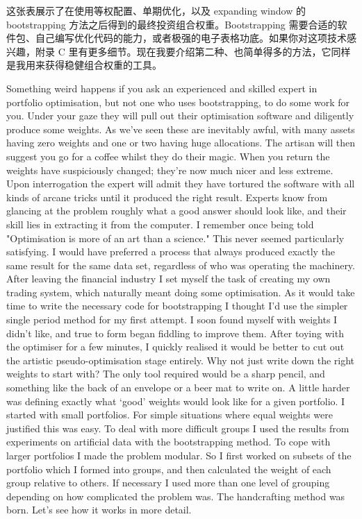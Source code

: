 \begin{chineseblock}这张表展示了在使用等权配置、单期优化，以及 expanding window 的 bootstrapping 方法之后得到的最终投资组合权重。Bootstrapping 需要合适的软件包、自己编写优化代码的能力，或者极强的电子表格功底。如果你对这项技术感兴趣，附录 C 里有更多细节。现在我要介绍第二种、也简单得多的方法，它同样是我用来获得稳健组合权重的工具。\end{chineseblock}


\begin{englishblock} Something weird happens if you ask an experienced and skilled expert in portfolio optimisation, but not one who uses bootstrapping, to do some work for you. Under your gaze they will pull out their optimisation software and diligently produce some weights. As we've seen these are inevitably awful, with many assets having zero weights and one or two having huge allocations. The artisan will then suggest you go for a coffee whilst they do their magic. When you return the weights have suspiciously changed; they're now much nicer and less extreme. Upon interrogation the expert will admit they have tortured the software with all kinds of arcane tricks until it produced the right result. Experts know from glancing at the problem roughly what a good answer should look like, and their skill lies in extracting it from the computer. I remember once being told "Optimisation is more of an art than a science." This never seemed particularly satisfying. I would have preferred a process that always produced exactly the same result for the same data set, regardless of who was operating the machinery. After leaving the financial industry I set myself the task of creating my own trading system, which naturally meant doing some optimisation. As it would take time to write the necessary code for bootstrapping I thought I'd use the simpler single period method for my first attempt. I soon found myself with weights I didn't like, and true to form began fiddling to improve them. After toying with the optimiser for a few minutes, I quickly realised it would be better to cut out the artistic pseudo-optimisation stage entirely. Why not just write down the right weights to start with? The only tool required would be a sharp pencil, and something like the back of an envelope or a beer mat to write on. A little harder was defining exactly what ‘good' weights would look like for a given portfolio. I started with small portfolios. For simple situations where equal weights were justified this was easy. To deal with more difficult groups I used the results from experiments on artificial data with the bootstrapping method. To cope with larger portfolios I made the problem modular. So I first worked on subsets of the portfolio which I formed into groups, and then calculated the weight of each group relative to others. If necessary I used more than one level of grouping depending on how complicated the problem was. The handcrafting method was born. Let's see how it works in more detail. \end{englishblock}

